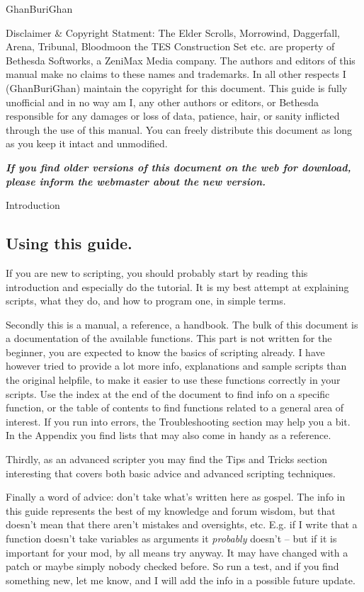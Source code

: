 \documentclass[
]{article}
\begin{document}
GhanBuriGhan

Disclaimer \& Copyright Statment: The Elder Scrolls, Morrowind, Daggerfall, Arena, Tribunal, Bloodmoon the TES Construction Set etc. are property of Bethesda Softworks, a ZeniMax Media company. The authors and editors of this manual make no claims to these names and trademarks. In all other respects I (GhanBuriGhan) maintain the copyright for this document. This guide is fully unofficial and in no way am I, any other authors or editors, or Bethesda responsible for any damages or loss of data, patience, hair, or sanity inflicted through the use of this manual. You can freely distribute this document as long as you keep it intact and unmodified.

\emph{\textbf{If you find older versions of this document on the web for
download, please inform the webmaster about the new version.}}

\protect\hypertarget{_Toc53412549}{}{}Introduction

\hypertarget{using-this-guide.}{%
\subsection{Using this guide.}\label{using-this-guide.}}

If you are new to scripting, you should probably start by reading this
introduction and especially do the tutorial. It is my best attempt at
explaining scripts, what they do, and how to program one, in simple
terms.

Secondly this is a manual, a reference, a handbook. The bulk of this
document is a documentation of the available functions. This part is not
written for the beginner, you are expected to know the basics of
scripting already. I have however tried to provide a lot more info,
explanations and sample scripts than the original helpfile, to make it
easier to use these functions correctly in your scripts. Use the index
at the end of the document to find info on a specific function, or the
table of contents to find functions related to a general area of
interest. If you run into errors, the Troubleshooting section may help
you a bit. In the Appendix you find lists that may also come in handy as
a reference.

Thirdly, as an advanced scripter you may find the Tips and Tricks
section interesting that covers both basic advice and advanced scripting
techniques.

Finally a word of advice: don't take what's written here as gospel. The
info in this guide represents the best of my knowledge and forum wisdom,
but that doesn't mean that there aren't mistakes and oversights, etc.
E.g. if I write that a function doesn't take variables as arguments it
\emph{probably} doesn't -- but if it is important for your mod, by all
means try anyway. It may have changed with a patch or maybe simply
nobody checked before. So run a test, and if you find something new, let
me know, and I will add the info in a possible future update.
\end{document}
